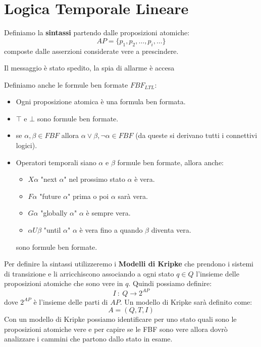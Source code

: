 \section{Logica Temporale Lineare}
Definiamo la \textbf{sintassi} partendo dalle proposizioni atomiche:
\begin{equation}
    AP=\{ p_1,p_2,\dots,p_i,\dots \}
\end{equation}
composte dalle asserzioni considerate vere a prescindere.
\begin{esempio}
    Il messaggio è stato spedito, la spia di allarme è accesa
\end{esempio}
Definiamo anche le formule ben formate $FBF_{LTL}$:
\begin{itemize}
    \item Ogni proposizione atomica è una formula ben formata.
    \item $\top$ e $\bot$ sono formule ben formate.
    \item se $\alpha,\beta\in FBF$ allora $\alpha\lor \beta,\lnot \alpha \in FBF$
          (da queste si derivano tutti i connettivi logici).
    \item Operatori temporali siano $\alpha$ e $\beta$ formule ben formate, allora
          anche:
          \begin{itemize}
              \item $X\alpha$ "next $\alpha$" nel prossimo stato $\alpha$ è vera.
              \item $F\alpha$ "future $\alpha$" prima o poi $\alpha$ sarà vera.
              \item $G\alpha$ "globally $\alpha$" $\alpha$ è sempre vera.
              \item $\alpha U\beta$ "until $\alpha$" $\alpha$ è vera fino
                    a quando $\beta$ diventa vera.
          \end{itemize}
          sono formule ben formate.
\end{itemize}
Per definire la sintassi utilizzeremo i \textbf{Modelli di Kripke} che prendono
i sistemi di transizione e li arricchiscono associando a ogni stato $q \in Q$
l'insieme delle proposizioni atomiche che sono vere in $q$. Quindi possiamo
definire:
\begin{equation}
    I \ : \ Q \rightarrow 2 ^{AP}
\end{equation}
dove $2^{AP}$ è l'insieme delle parti di $AP$. Un modello di Kripke sarà definito
come:
\begin{equation}
    A=(Q,T,I)
\end{equation}
Con un modello di Kripke possiamo identificare per uno stato quali sono le
proposizioni atomiche vere e per capire se le FBF sono vere allora dovrò analizzare
i cammini che partono dallo stato in esame.

